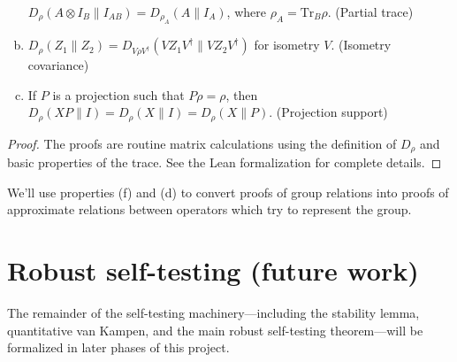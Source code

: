 \begin{lemma}
\begin{enumerate}[(a)]
		$D_\rho(A\otimes I_B \| I_{AB}) = D_{\rho_A}(A \| I_A)$, where $\rho_A = \mathrm{Tr}_B \rho$. (Partial trace)
		\item\label{item:state-dependent-distance-isometry}
		$D_\rho(Z_1 \| Z_2) = D_{V\rho V^\dagger}(VZ_1V^\dagger \| VZ_2V^\dagger)$ for isometry $V$. (Isometry covariance)
		\item\label{item:state-dependent-distance-projection-is-identity}
		If $P$ is a projection such that $P\rho = \rho$, then $D_\rho(XP \| I) = D_\rho(X \| I) = D_\rho(X \| P)$. (Projection support)
	\end{enumerate}
\end{lemma}

\begin{proof}
The proofs are routine matrix calculations using the definition of $D_\rho$ and basic properties of the trace. See the Lean formalization for complete details.
\end{proof}

We'll use properties (f) and (d) to convert proofs of group relations into proofs of approximate relations between operators which try to represent the group.

\section{Robust self-testing (future work)}

The remainder of the self-testing machinery---including the stability lemma, quantitative van Kampen, and the main robust self-testing theorem---will be formalized in later phases of this project.
